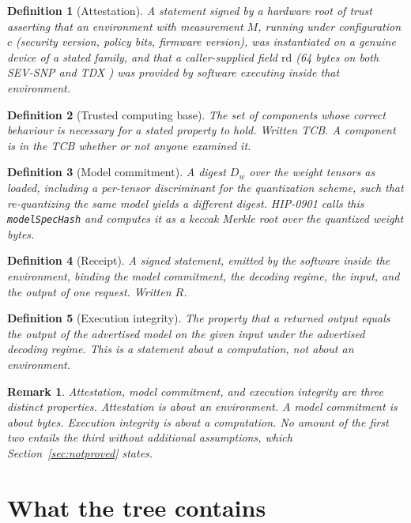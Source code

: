 \documentclass[11pt]{article}
\newcommand{\code}[1]{\texttt{#1}}
\newtheorem{definition}{Definition}
\newtheorem{remark}{Remark}
\begin{document}
\begin{definition}[Attestation]
A statement signed by a hardware root of trust asserting that an environment with measurement $M$,
running under configuration $c$ (security version, policy bits, firmware version), was instantiated
on a genuine device of a stated family, and that a caller-supplied field $\mathrm{rd}$ (64 bytes on
both SEV-SNP \cite{snpabi} and TDX \cite{tdx}) was provided by software executing inside that
environment.
\end{definition}

\begin{definition}[Trusted computing base]
The set of components whose correct behaviour is necessary for a stated property to hold. Written
TCB. A component is in the TCB whether or not anyone examined it.
\end{definition}

\begin{definition}[Model commitment]
A digest $D_w$ over the weight tensors as loaded, including a per-tensor discriminant for the
quantization scheme, such that re-quantizing the same model yields a different digest. HIP-0901
calls this \code{modelSpecHash} and computes it as a keccak Merkle root over the quantized weight
bytes.
\end{definition}

\begin{definition}[Receipt]
A signed statement, emitted by the software inside the environment, binding the model commitment,
the decoding regime, the input, and the output of one request. Written $R$.
\end{definition}

\begin{definition}[Execution integrity]
The property that a returned output equals the output of the advertised model on the given input
under the advertised decoding regime. This is a statement about a computation, not about an
environment.
\end{definition}

\begin{remark}
Attestation, model commitment, and execution integrity are three distinct properties. Attestation is
about an environment. A model commitment is about bytes. Execution integrity is about a computation.
No amount of the first two entails the third without additional assumptions, which
Section~\ref{sec:notproved} states.
\end{remark}

\section{What the tree contains}
\label{sec:observed}
\end{document}
